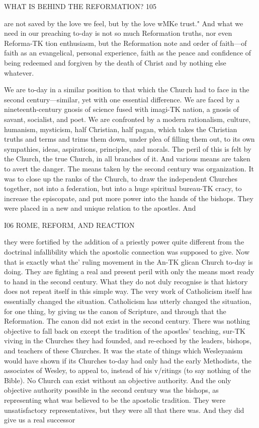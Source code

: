 \documentclass[12pt,a5paper,twoside]{book}
\begin{document}
WHAT IS BEHIND THE REFORMATION? 105 

are not saved by the love we feel, but by the love wMKe 
trust." And what we need in our preaching to-day is 
not so much Reformation truths, nor even Reforma-TK
tion enthusiasm, but the Reformation note and order of 
faith---of faith as an evangelical, personal experience, 
faith as the peace and confidence of being redeemed 
and forgiven by the death of Christ and by nothing 
else whatever. 

We are to-day in a similar position to that which 
the Church had to face in the second century---similar, 
yet with one essential difference. We are faced by a 
nineteenth-century gnosis of science fused with imagi-TK
nation, a gnosis of savant, socialist, and poet. We are 
confronted by a modern rationalism, culture, humanism, 
mysticism, half Christian, half pagan, which takes the 
Christian truths and terms and trims them down, 
under plea of filling them out, to its own sympathies, 
ideas, aspirations, principles, and morals. The peril 
of this is felt by the Church, the true Church, in all 
branches of it. And various means are taken to avert 
the danger. The means taken by the second century 
was organization. It was to close up the ranks of the 
Church, to draw the independent Churches together, 
not into a federation, but into a huge spiritual bureau-TK
cracy, to increase the episcopate, and put more power 
into the hands of the bishops. They were placed 
in a new and unique relation to the apostles. And 



I06 ROME, REFORM, AND REACTION 

they were fortified by the addition of a priestly power 
quite different from the doctrinal infallibility which 
the apostolic connection was supposed to give. Now 
that is exactly what the' ruling movement in the An-TK
glican Church to-day is doing. They are fighting a 
real and present peril with only the means most ready 
to hand in the second century. What they do not duly 
recognise is that history does not repeat itself in this 
simple way. The very work of Catholicism itself has 
essentially changed the situation. Catholicism has 
utterly changed the situation, for one thing, by giving 
us the canon of Scripture, and through that the 
Reformation. The canon did not exist in the second 
century. There was nothing objective to fall back 
on except the tradition of the apostles' teaching, sur-TK
viving in the Churches they had founded, and re-echoed 
by the leaders, bishops, and teachers of these Churches. 
It was the state of things which Wesleyanism would 
have shown if its Churches to-day had only had the 
early Methodists, the associates of Wesley, to appeal 
to, instead of his v/ritings (to say nothing of the 
Bible). No Church can exist without an objective 
authority. And the only objective authority possible 
in the second century was the bishops, as representing 
what was believed to be the apostolic tradition. They 
were unsatisfactory representatives, but they were all 
that there was. And they did give us a real successor 
\end{document}
